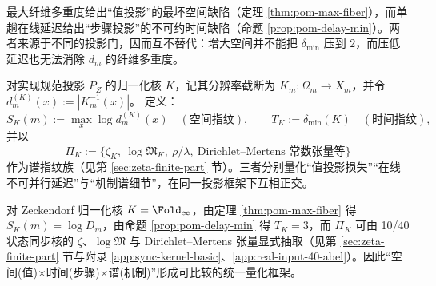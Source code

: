\begin{remark}[空间缺陷与时间缺陷的正交性]\label{rem:pom-space-time-orth}
最大纤维多重度给出“值投影”的最坏空间缺陷（定理 \ref{thm:pom-max-fiber}），而单趟在线延迟给出“步骤投影”的不可约时间缺陷（命题 \ref{prop:pom-delay-min}）。两者来源于不同的投影门，因而互不替代：增大空间并不能把 $\delta_{\min}$ 压到 $2$，而压低延迟也无法消除 $d_m$ 的纤维多重度。
\end{remark}

\begin{definition}[空间—时间—谱三指纹]\label{def:pom-fingerprint}
对实现规范投影 $P_Z$ 的归一化核 $K$，记其分辨率截断为 $K_m:\Omega_m\to X_m$，并令
\(
d^{(K)}_m(x):=|K_m^{-1}(x)|
\)。
定义：
\[
S_K(m):=\max_{x}\log d^{(K)}_m(x)\quad(\text{空间指纹}),
\qquad
T_K:=\delta_{\min}(K)\quad(\text{时间指纹}),
\]
并以
\[
\Pi_K:=\{\zeta_K,\ \log\mathfrak{M}_K,\ \rho/\lambda,\ \text{Dirichlet--Mertens 常数张量等}\}
\]
作为谱指纹族（见第 \ref{sec:zeta-finite-part} 节）。三者分别量化“值投影损失”“在线不可并行延迟”与“机制谱细节”，在同一投影框架下互相正交。
\end{definition}

\begin{remark}\label{rem:pom-fold-fingerprint}
对 Zeckendorf 归一化核 $K=\Fold_\infty$，由定理 \ref{thm:pom-max-fiber} 得 $S_K(m)=\log D_m$，由命题 \ref{prop:pom-delay-min} 得 $T_K=3$，而 $\Pi_K$ 可由 10/40 状态同步核的 $\zeta$、$\log\mathfrak{M}$ 与 Dirichlet--Mertens 张量显式抽取（见第 \ref{sec:zeta-finite-part} 节与附录 \ref{app:sync-kernel-basic}、\ref{app:real-input-40-abel}）。因此“空间(值)$\times$时间(步骤)$\times$谱(机制)”形成可比较的统一量化框架。
\end{remark}

